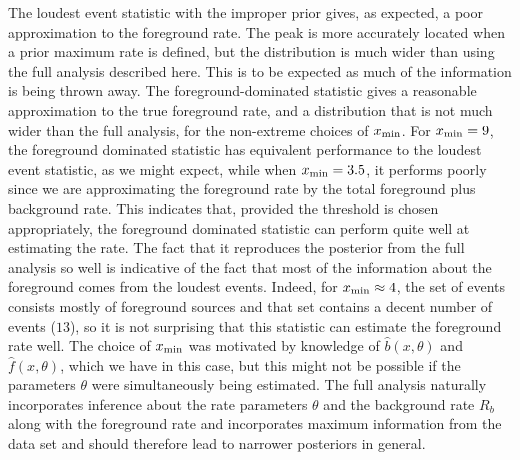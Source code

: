 \documentclass[aps,prd]{revtex4-1}
\begin{document}
The loudest event statistic with the improper prior gives, as
expected, a poor approximation to the foreground rate. The peak is
more accurately located when a prior maximum rate is defined, but the
distribution is much wider than using the full analysis described
here. This is to be expected as much of the information is being
thrown away. The foreground-dominated statistic gives a reasonable
approximation to the true foreground rate, and a distribution that is
not much wider than the full analysis, for the non-extreme choices of
$x_{\rm min}$. For $x_{\rm min}=9$, the foreground dominated statistic
has equivalent performance to the loudest event statistic, as we might
expect, while when $x_{\rm min}=3.5$, it performs poorly since we are
approximating the foreground rate by the total foreground plus
background rate. This indicates that, provided the threshold is chosen
appropriately, the foreground dominated statistic can perform quite
well at estimating the rate. The fact that it reproduces the posterior
from the full analysis so well is indicative of the fact that most of
the information about the foreground comes from the loudest
events. Indeed, for $x_{\rm min} \approx 4$, the set of events
consists mostly of foreground sources and that set contains a decent
number of events ($13$), so it is not surprising that this statistic
can estimate the foreground rate well. The choice of $x_{\rm min}$ was
motivated by knowledge of $\hat{b}(x,\theta)$ and $\hat{f}(x,\theta)$,
which we have in this case, but this might not be possible if the
parameters $\theta$ were simultaneously being estimated. The full
analysis naturally incorporates inference about the rate parameters
$\theta$ and the background rate $R_b$ along with the foreground rate
and incorporates maximum information from the data set and should
therefore lead to narrower posteriors in general.
\end{document}
